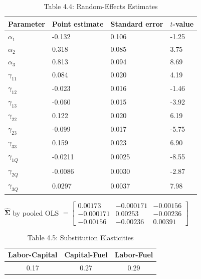 \documentclass[10pt]{article}
\begin{document}
\begin{table}[h]
\begin{center}
\captionsetup{labelformat=empty}
\caption{Table 4.4: Random-Effects Estimates}
\begin{tabular}{|l|l|l|l|}
\hline
Parameter & Point estimate & Standard error & $t$-value \\
\hline
$\alpha_{1}$ & -0.132 & 0.106 & -1.25 \\
\hline
$\alpha_{2}$ & 0.318 & 0.085 & 3.75 \\
\hline
$\alpha_{3}$ & 0.813 & 0.094 & 8.69 \\
\hline
$\gamma_{11}$ & 0.084 & 0.020 & 4.19 \\
\hline
$\gamma_{12}$ & -0.023 & 0.016 & -1.46 \\
\hline
$\gamma_{13}$ & -0.060 & 0.015 & -3.92 \\
\hline
$\gamma_{22}$ & 0.122 & 0.020 & 6.19 \\
\hline
$\gamma_{23}$ & -0.099 & 0.017 & -5.75 \\
\hline
$\gamma_{33}$ & 0.159 & 0.023 & 6.90 \\
\hline
$\gamma_{1 Q}$ & -0.0211 & 0.0025 & -8.55 \\
\hline
$\gamma_{2 Q}$ & -0.0086 & 0.0030 & -2.87 \\
\hline
$\gamma_{3 Q}$ & 0.0297 & 0.0037 & 7.98 \\
\hline
\end{tabular}
\end{center}
\end{table}

$\widehat{\mathbf{\Sigma}}$ by pooled OLS $=\left[\begin{array}{ccc}0.00173 & -0.000171 & -0.00156 \\ -0.000171 & 0.00253 & -0.00236 \\ -0.00156 & -0.00236 & 0.00391\end{array}\right]$

\begin{table}[h]
\begin{center}
\captionsetup{labelformat=empty}
\caption{Table 4.5: Substitution Elasticities}
\begin{tabular}{ccc}
\hline\hline
Labor-Capital & Capital-Fuel & Labor-Fuel \\
\hline
0.17 & 0.27 & 0.29 \\
\hline
\end{tabular}
\end{center}
\end{table}
\end{document}
